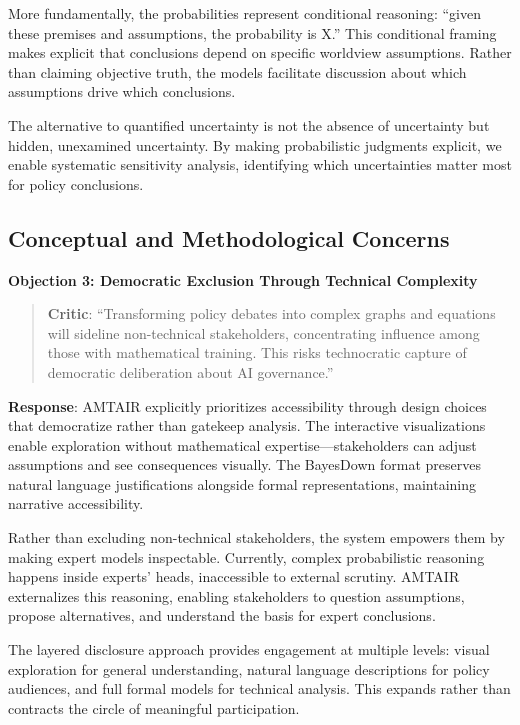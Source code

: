 \documentclass[
  11pt,
  letterpaper,
]{book}
\begin{document}
More fundamentally, the probabilities represent conditional reasoning:
``given these premises and assumptions, the probability is X.'' This
conditional framing makes explicit that conclusions depend on specific
worldview assumptions. Rather than claiming objective truth, the models
facilitate discussion about which assumptions drive which conclusions.

The alternative to quantified uncertainty is not the absence of
uncertainty but hidden, unexamined uncertainty. By making probabilistic
judgments explicit, we enable systematic sensitivity analysis,
identifying which uncertainties matter most for policy conclusions.

\subsection{Conceptual and Methodological
Concerns}\label{sec-conceptual-concerns}

\textbf{Objection 3: Democratic Exclusion Through Technical Complexity}

\begin{quote}
\textbf{Critic}: ``Transforming policy debates into complex graphs and
equations will sideline non-technical stakeholders, concentrating
influence among those with mathematical training. This risks
technocratic capture of democratic deliberation about AI governance.''
\end{quote}

\textbf{Response}: AMTAIR explicitly prioritizes accessibility through
design choices that democratize rather than gatekeep analysis. The
interactive visualizations enable exploration without mathematical
expertise---stakeholders can adjust assumptions and see consequences
visually. The BayesDown format preserves natural language justifications
alongside formal representations, maintaining narrative accessibility.

Rather than excluding non-technical stakeholders, the system empowers
them by making expert models inspectable. Currently, complex
probabilistic reasoning happens inside experts' heads, inaccessible to
external scrutiny. AMTAIR externalizes this reasoning, enabling
stakeholders to question assumptions, propose alternatives, and
understand the basis for expert conclusions.

The layered disclosure approach provides engagement at multiple levels:
visual exploration for general understanding, natural language
descriptions for policy audiences, and full formal models for technical
analysis. This expands rather than contracts the circle of meaningful
participation.
\end{document}
